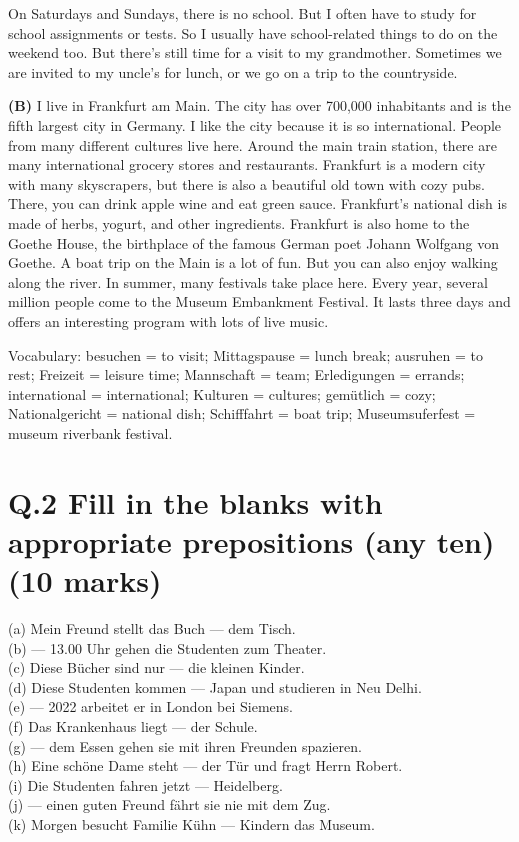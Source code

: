 \documentclass[a4paper,12pt]{article}
\begin{document}
On Saturdays and Sundays, there is no school. But I often have to study for school assignments or tests. So I usually have school-related things to do on the weekend too. But there’s still time for a visit to my grandmother. Sometimes we are invited to my uncle’s for lunch, or we go on a trip to the countryside.

\vspace{1em}

\textbf{(B)} I live in Frankfurt am Main. The city has over 700,000 inhabitants and is the fifth largest city in Germany. I like the city because it is so international. People from many different cultures live here. Around the main train station, there are many international grocery stores and restaurants. Frankfurt is a modern city with many skyscrapers, but there is also a beautiful old town with cozy pubs. There, you can drink apple wine and eat green sauce. Frankfurt’s national dish is made of herbs, yogurt, and other ingredients. Frankfurt is also home to the Goethe House, the birthplace of the famous German poet Johann Wolfgang von Goethe. A boat trip on the Main is a lot of fun. But you can also enjoy walking along the river. In summer, many festivals take place here. Every year, several million people come to the Museum Embankment Festival. It lasts three days and offers an interesting program with lots of live music.


\vspace{0.5cm}

Vocabulary: 
besuchen = to visit; Mittagspause = lunch break; ausruhen = to rest; Freizeit = leisure time; Mannschaft = team; Erledigungen = errands; international = international; Kulturen = cultures; gemütlich = cozy; Nationalgericht = national dish; Schifffahrt = boat trip; Museumsuferfest = museum riverbank festival.

\vspace{1cm}

\section*{Q.2 Fill in the blanks with appropriate prepositions (any ten) (10 marks)}

(a) Mein Freund stellt das Buch --- dem Tisch.\\
(b) --- 13.00 Uhr gehen die Studenten zum Theater.\\
(c) Diese Bücher sind nur --- die kleinen Kinder.\\
(d) Diese Studenten kommen --- Japan und studieren in Neu Delhi.\\
(e) --- 2022 arbeitet er in London bei Siemens.\\
(f) Das Krankenhaus liegt --- der Schule.\\
(g) --- dem Essen gehen sie mit ihren Freunden spazieren.\\
(h) Eine schöne Dame steht --- der Tür und fragt Herrn Robert.\\
(i) Die Studenten fahren jetzt --- Heidelberg.\\
(j) --- einen guten Freund fährt sie nie mit dem Zug.\\
(k) Morgen besucht Familie Kühn --- Kindern das Museum.
\end{document}
